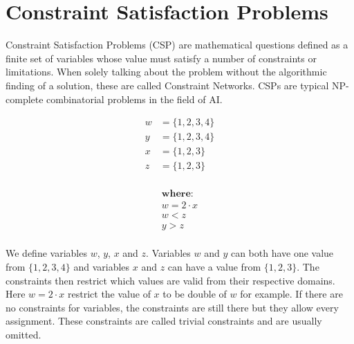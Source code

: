 \chapter{Constraint Satisfaction Problems}

Constraint Satisfaction Problems (CSP) \cite{csp:1987} are mathematical questions defined as a finite set of variables whose value must satisfy a number of constraints or limitations. When solely talking about the problem without the algorithmic finding of a solution, these are called Constraint Networks. CSPs are typical NP-complete combinatorial problems in the field of AI.

\begin{tcolorbox}[title=Example:]
	\begin{multicols}{2}
		\begin{equation*}
			\begin{aligned}
				w & = \{1, 2, 3, 4\} \\
				y & = \{1, 2, 3, 4\} \\
				x & = \{1, 2, 3\}    \\
				z & = \{1, 2, 3\}    \\
			\end{aligned}
		\end{equation*}

		\columnbreak

		\noindent
		\begin{equation*}
			\begin{aligned}
				\textbf{where:} \\
				w = 2 \cdot x   \\
				w < z           \\
				y > z           \\
			\end{aligned}
		\end{equation*}
	\end{multicols}
\end{tcolorbox}

We define variables $w$, $y$, $x$ and $z$. Variables $w$ and $y$ can both have one value from $\{1, 2, 3, 4\}$ and variables $x$ and $z$ can have a value from $\{1, 2, 3\}$. The constraints then restrict which values are valid from their respective domains. Here $w = 2 \cdot x$ restrict the value of $x$ to be double of $w$ for example. If there are no constraints for variables, the constraints are still there but they allow every assignment. These constraints are called trivial constraints and are usually omitted.

